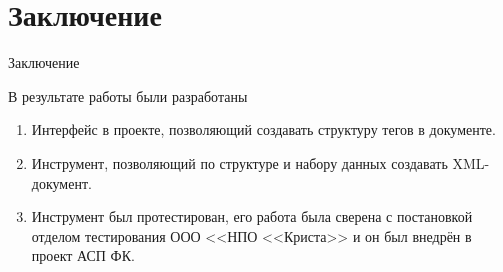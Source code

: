 \documentclass[fullscreen=true,russian,compress,%
	hyperref={unicode,bookmarks=false}]{presentation}
\begin{document}
\section{Заключение}

\begin{frame}{Заключение}
     \begin{block}{В результате работы были разработаны}
        \begin{enumerate}
	      \item Интерфейс в проекте, позволяющий создавать структуру тегов в документе.
            \item Инструмент, позволяющий по структуре и набору данных создавать XML-документ.
            \item Инструмент был протестирован, его работа была сверена с постановкой отделом тестирования ООО <<НПО <<Криста>> и он был внедрён в проект АСП ФК.
        \end{enumerate}
    \end{block}
\end{frame}

\appendix
\end{document}
